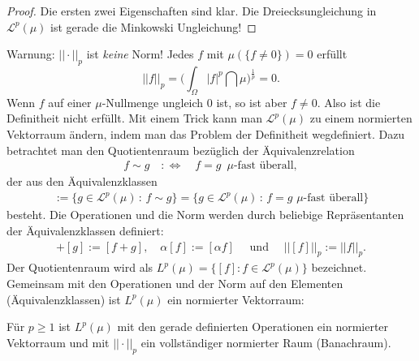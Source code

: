 \begin{proof}
	Die ersten zwei Eigenschaften sind klar. Die Dreiecksungleichung in $\mathcal L^p(\mu)$ ist gerade die Minkowski Ungleichung!
\end{proof}

Warnung: $||\cdot ||_p$ ist \textit{keine} Norm! Jedes $f$ mit $\mu(\{f \neq 0\})=0$ erfüllt \[ || f ||_p = \Big( \int_{\Omega} |f|^p \dint \mu \Big)^{\frac{1}{p}} = 0. \] 
Wenn $f$ auf einer $\mu$-Nullmenge ungleich $0$ ist, so ist aber $f\neq 0$. Also ist die Definitheit nicht erf\"ullt. Mit einem Trick kann man $\mathcal L^p(\mu)$ zu einem normierten Vektorraum \"andern, indem man das Problem der Definitheit wegdefiniert. Dazu betrachtet man den Quotientenraum bez\"uglich der  \"Aquivalenzrelation
\begin{align*}
f \sim g \quad :\Leftrightarrow\quad f = g \,\,\,\mu\text{-fast überall},
\end{align*}
der aus den \"Aquivalenzklassen 
\begin{align*}
[f]:=\big\{g\in \mathcal L^p(\mu)\,:\, f\sim g\big\}=\big\{g\in \mathcal L^p(\mu)\,:\, f=g\,\,\mu\text{-fast \"uberall} \big\}
\end{align*}
besteht. Die Operationen und die Norm werden durch beliebige Repr\"asentanten der \"Aquivalenzklassen definiert:
\begin{align*}
[f]+[g]:=[f+g], \quad \alpha [f]:=[\alpha f] \quad \text{ und }\quad ||[f]||_p:=||f||_p.
\end{align*}
Der Quotientenraum wird als  $L^p(\mu)=\{[f]: f\in \mathcal L^p(\mu)\}$ bezeichnet. Gemeinsam mit den Operationen und der Norm auf den Elementen (\"Aquivalenzklassen) ist $L^p(\mu)$ ein normierter Vektorraum:
\begin{satz}\label{Lp}
	F\"ur $p\geq 1$ ist $L^p(\mu)$ mit den gerade definierten Operationen ein normierter Vektorraum und mit $||\cdot||_p$ ein vollst\"andiger normierter Raum (Banachraum).
\end{satz}

